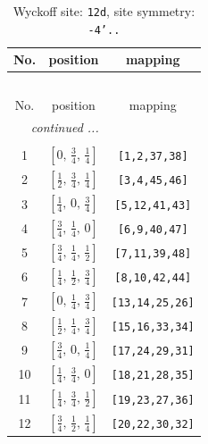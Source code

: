 \documentclass[fleqn,8pt]{jsarticle}
\begin{document}
\begin{longtable}{ccc}
\caption{Wyckoff site: {\tt 12d}, site symmetry: {\tt -4'..}}
 \\
 \hline \hline
No. & position & mapping \\ \hline \endfirsthead

\multicolumn{2}{l}{\tablename\ \thetable{}} \\
 \hline \hline
No. & position & mapping \\ \hline \endhead

 \hline \hline
\multicolumn{2}{r}{\footnotesize\it continued ...} \\ \endfoot

 \hline \hline
\multicolumn{2}{r}{} \\ \endlastfoot

1 & $\left[ 0,\, \frac{3}{4},\, \frac{1}{4} \right]$ & {\tt [1,2,37,38]} \\ \hline
2 & $\left[ \frac{1}{2},\, \frac{3}{4},\, \frac{1}{4} \right]$ & {\tt [3,4,45,46]} \\ \hline
3 & $\left[ \frac{1}{4},\, 0,\, \frac{3}{4} \right]$ & {\tt [5,12,41,43]} \\ \hline
4 & $\left[ \frac{3}{4},\, \frac{1}{4},\, 0 \right]$ & {\tt [6,9,40,47]} \\ \hline
5 & $\left[ \frac{3}{4},\, \frac{1}{4},\, \frac{1}{2} \right]$ & {\tt [7,11,39,48]} \\ \hline
6 & $\left[ \frac{1}{4},\, \frac{1}{2},\, \frac{3}{4} \right]$ & {\tt [8,10,42,44]} \\ \hline
7 & $\left[ 0,\, \frac{1}{4},\, \frac{3}{4} \right]$ & {\tt [13,14,25,26]} \\ \hline
8 & $\left[ \frac{1}{2},\, \frac{1}{4},\, \frac{3}{4} \right]$ & {\tt [15,16,33,34]} \\ \hline
9 & $\left[ \frac{3}{4},\, 0,\, \frac{1}{4} \right]$ & {\tt [17,24,29,31]} \\ \hline
10 & $\left[ \frac{1}{4},\, \frac{3}{4},\, 0 \right]$ & {\tt [18,21,28,35]} \\ \hline
11 & $\left[ \frac{1}{4},\, \frac{3}{4},\, \frac{1}{2} \right]$ & {\tt [19,23,27,36]} \\ \hline
12 & $\left[ \frac{3}{4},\, \frac{1}{2},\, \frac{1}{4} \right]$ & {\tt [20,22,30,32]} \\
\end{longtable}
\renewcommand{\arraystretch}{1.2}
\end{document}

